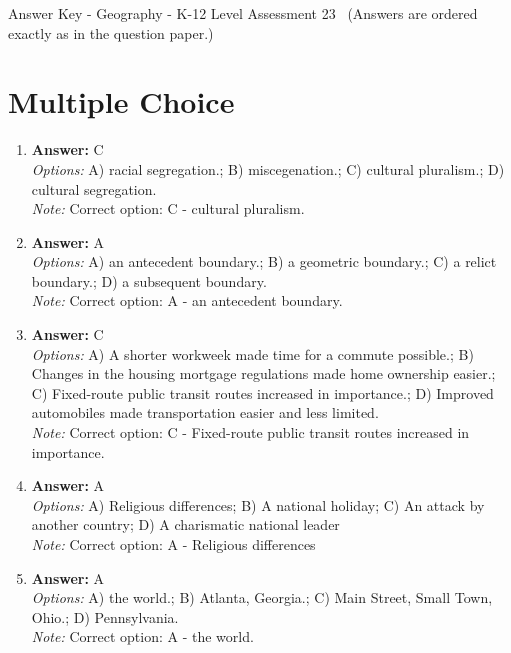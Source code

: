 \documentclass[12pt]{article}
\begin{document}
\begin{center}
Answer Key - Geography - K-12 Level Assessment 23 \
\small (Answers are ordered exactly as in the question paper.)
\end{center}

\section*{Multiple Choice}
\begin{enumerate}[label=\arabic*.]
\item \textbf{Answer:} C
\\ \textit{Options:} A) racial segregation.; B) miscegenation.; C) cultural pluralism.; D) cultural segregation.
\\ \textit{Note:} Correct option: C - cultural pluralism.
\item \textbf{Answer:} A
\\ \textit{Options:} A) an antecedent boundary.; B) a geometric boundary.; C) a relict boundary.; D) a subsequent boundary.
\\ \textit{Note:} Correct option: A - an antecedent boundary.
\item \textbf{Answer:} C
\\ \textit{Options:} A) A shorter workweek made time for a commute possible.; B) Changes in the housing mortgage regulations made home ownership easier.; C) Fixed-route public transit routes increased in importance.; D) Improved automobiles made transportation easier and less limited.
\\ \textit{Note:} Correct option: C - Fixed-route public transit routes increased in importance.
\item \textbf{Answer:} A
\\ \textit{Options:} A) Religious differences; B) A national holiday; C) An attack by another country; D) A charismatic national leader
\\ \textit{Note:} Correct option: A - Religious differences
\item \textbf{Answer:} A
\\ \textit{Options:} A) the world.; B) Atlanta, Georgia.; C) Main Street, Small Town, Ohio.; D) Pennsylvania.
\\ \textit{Note:} Correct option: A - the world.
\end{enumerate}
\end{document}
